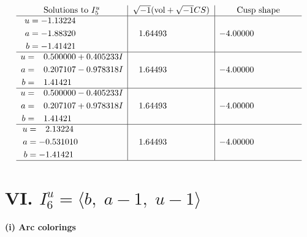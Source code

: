 \documentclass[1p]{elsarticle_modified}
\theoremstyle{definition}
\newcommand{\I}{\sqrt{-1}}
\begin{document}
$$\begin{array}{c|c|c}  
\text{Solutions to }I^u_{5}& \I (\text{vol} + \sqrt{-1}CS) & \text{Cusp shape}\\
 \hline 
\begin{aligned}
u &= -1.13224\phantom{ +0.000000I} \\
a &= -1.88320\phantom{ +0.000000I} \\
b &= -1.41421\phantom{ +0.000000I}\end{aligned}
 & \phantom{-}1.64493\phantom{ +0.000000I} & -4.00000\phantom{ +0.000000I} \\ \hline\begin{aligned}
u &= \phantom{-}0.500000 + 0.405233 I \\
a &= \phantom{-}0.207107 - 0.978318 I \\
b &= \phantom{-}1.41421\phantom{ +0.000000I}\end{aligned}
 & \phantom{-}1.64493\phantom{ +0.000000I} & -4.00000\phantom{ +0.000000I} \\ \hline\begin{aligned}
u &= \phantom{-}0.500000 - 0.405233 I \\
a &= \phantom{-}0.207107 + 0.978318 I \\
b &= \phantom{-}1.41421\phantom{ +0.000000I}\end{aligned}
 & \phantom{-}1.64493\phantom{ +0.000000I} & -4.00000\phantom{ +0.000000I} \\ \hline\begin{aligned}
u &= \phantom{-}2.13224\phantom{ +0.000000I} \\
a &= -0.531010\phantom{ +0.000000I} \\
b &= -1.41421\phantom{ +0.000000I}\end{aligned}
 & \phantom{-}1.64493\phantom{ +0.000000I} & -4.00000\phantom{ +0.000000I}\\
 \hline 
 \end{array}$$\newpage\newpage\renewcommand{\arraystretch}{1}
\centering \section*{VI. $I^u_{6}= \langle b,\;a-1,\;u-1 \rangle$}
\flushleft \textbf{(i) Arc colorings}\\
\end{document}
